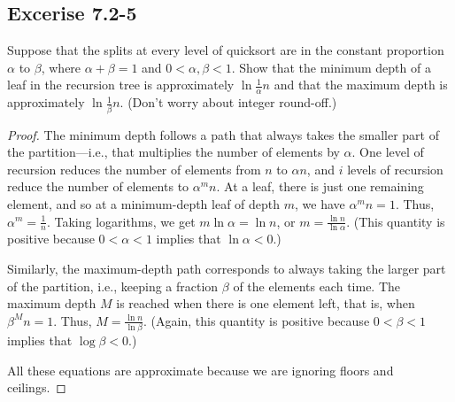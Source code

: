 \documentclass{article}
\begin{document}
\newpage 
%
\subsection*{Excerise 7.2-5}
Suppose that the splits at every level of quicksort are in the constant proportion $\alpha$ to $\beta$, where $\alpha + \beta = 1$ and $0 < \alpha, \beta < 1$. 
Show that the minimum depth of a leaf in the recursion tree is approximately $\ln \frac{1}{\alpha} n$ and that the maximum depth is approximately $\ln \frac{1}{\beta} n$. (Don't worry about integer round-off.)
\begin{proof}

The minimum depth follows a path that always takes the smaller part of the partition—i.e., 
that multiplies the number of elements by $\alpha$. 
One level of recursion reduces the number of elements from $n$ to $\alpha n$, 
and $i$ levels of recursion reduce the number of elements to $\alpha^m n$. 
At a leaf, there is just one remaining element, 
and so at a minimum-depth leaf of depth $m$, we have $\alpha^m n = 1$. 
Thus, $\alpha^m = \frac{1}{n}$. 
Taking logarithms, we get $m \ln \alpha = \ln n$, or $m = \frac{\ln n}{\ln \alpha}$. 
(This quantity is positive because $0 < \alpha < 1$ implies that $\ln \alpha < 0$.)

Similarly, the maximum-depth path corresponds to always taking the larger part of the partition, 
i.e., keeping a fraction $\beta$ of the elements each time. 
The maximum depth $M$ is reached when there is one element left, 
that is, when $\beta^M n = 1$. 
Thus, $M = \frac{\ln n}{\ln \beta}$. 
(Again, this quantity is positive because $0 < \beta < 1$ implies that $\log \beta < 0$.)

All these equations are approximate because we are ignoring floors and ceilings.
\end{proof}
\end{document}
